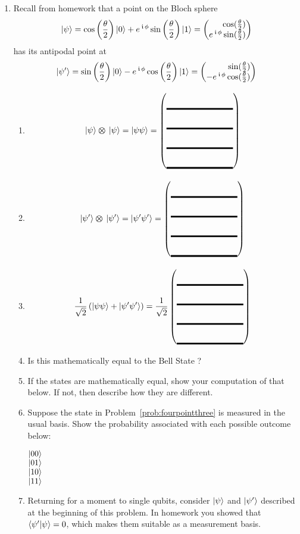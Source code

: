 \documentclass[12pt]{article}
\def\TwoQBlank{%
\DQB{\Blank[8em]}{\Blank[8em]}{\Blank[8em]}{\Blank[8em]}%
}
\begin{document}
\begin{enumerate}
\item\label{prob:five} Recall from homework that a point on the Bloch sphere
\[
\ket{\psi} = \cos\left(\frac{\theta}{2}\right)\ket{0}
    + \ExpPhase{\phi}\sin\left(\frac{\theta}{2}\right)\ket{1} = \SQB{\cos(\frac{\theta}{2})}{\ExpPhase{\phi}\sin(\frac{\theta}{2})}
\]
has its antipodal point at
        \[
        \ket{\psi'}= \sin\left(\frac{\theta}{2}\right)\ket{0}-\ExpPhase{\phi}\cos\left(\frac{\theta}{2}\right)\ket{1} = \SQB{\sin(\frac{\theta}{2})}{-\ExpPhase{\phi}\cos(\frac{\theta}{2})}
        \]
\begin{enumerate}[label=\theenumi.\arabic*]
\item \[
\TensProd{\ket{\psi}}{\ket{\psi}} = \ket{\psi\psi} = \TwoQBlank{}
\]
\item \[
\TensProd{\ket{\psi'}}{\ket{\psi'}} = \ket{\psi'\psi'} = \TwoQBlank{}
\]
\item\label{prob:fourpointthree}
\[
\TwoSup{\psi\psi}{\psi'\psi'} = \RootTwo{}\TwoQBlank{}
\]
\item Is this mathematically equal to the Bell State ? \Blank{}
\item If the states are mathematically equal, show your computation of that below.  If not, then describe how they are different.
\LeaveSpace{}
\item Suppose the state in Problem~\ref{prob:fourpointthree} is measured in the usual \TensProd{\PauliZ}{\PauliZ} basis.  Show the probability associated with each possible outcome below:
\begin{description}
    \item[$\ket{00}$] \Blank[3in]{}
    \item[$\ket{01}$] \Blank[3in]{}
    \item[$\ket{10}$] \Blank[3in]{}
    \item[$\ket{11}$] \Blank[3in]{}
\end{description}
\item\label{prob:matrix} Returning for a moment to single qubits, consider $\ket{\psi}$ and $\ket{\psi'}$ described at the beginning of this problem. In homework you showed that $\braket{\psi'|\psi}=0$, which makes them suitable as a measurement basis.


\end{enumerate}
\end{enumerate}
\end{document}
